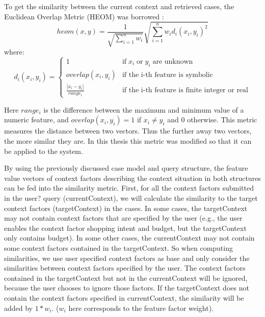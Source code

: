 To get the similarity between the current context and retrieved cases, the Euclidean Overlap Metric (HEOM) was borrowed \cite{ref:26, ref:34}:
\begin{equation} \label{eq:heom}
heom(x,y)=\frac{1}{\sqrt{\sum^n_{i=1}w_i}}\sqrt{\sum^n_{i=1}w_id_i(x_i,y_i)^2}
\end{equation}
where:
\begin{equation}\label{eq:heom_d}
d_i(x_i, y_i)=
\left\{\begin{matrix}
1 & \mbox{if} \; x_i \; \mbox{or} \; y_i \; \mbox{are unknown}\\ 
overlap(x_i,y_i) & \mbox{if the i-th feature is symbolic}\\ 
\frac{|x_i-y_i|}{range_i} & \mbox{if the i-th feature is finite integer or real} 
\end{matrix}\right.
\end{equation}

Here $range_i$ is the difference between the maximum and minimum value of a numeric feature, and $overlap(x_i, y_i)=1$ if $x_i \neq y_i$ and 0 otherwise. This metric measures the distance between two vectors. Thus the further away two vectors, the more similar they are. In this thesis this metric was modified so that it can be applied to the system.

By using the previously discussed case model and query structure, the feature value vectors of context factors describing the context situation in both structures can be fed into the similarity metric. First, for all the context factors submitted in the user? query (currentContext), we will calculate the similarity to the target context factors (targetContext) in the cases. In some cases, the targetContext may not contain context factors that are specified by the user (e.g., the user enables the context factor shopping intent and budget, but the targetContext only contains budget). In some other cases, the currentContext may not contain some context factors contained in the targetContext. So when computing similarities, we use user specified context factors as base and only consider the similarities between context factors specified by the user. The context factors contained in the targetContext but not in the currentContext will be ignored, because the user chooses to ignore those factors. If the targetContext does not contain the context factors specified in currentContext, the similarity will be added by $1* w_i$. ($w_i$ here corresponds to the feature factor weight).

